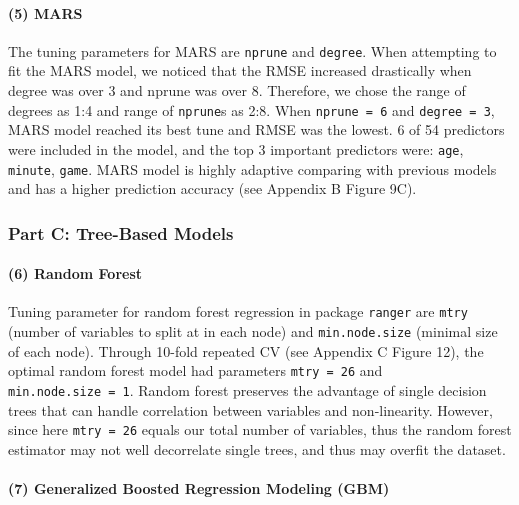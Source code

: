 \documentclass[
]{article}
\begin{document}
\hypertarget{mars}{%
\paragraph{(5) MARS}\label{mars}}

The tuning parameters for MARS are \texttt{nprune} and \texttt{degree}.
When attempting to fit the MARS model, we noticed that the RMSE
increased drastically when degree was over 3 and nprune was over 8.
Therefore, we chose the range of degrees as 1:4 and range of
\texttt{nprune}s as 2:8. When \texttt{nprune\ =\ 6} and
\texttt{degree\ =\ 3}, MARS model reached its best tune and RMSE was the
lowest. 6 of 54 predictors were included in the model, and the top 3
important predictors were: \texttt{age}, \texttt{minute}, \texttt{game}.
MARS model is highly adaptive comparing with previous models and has a
higher prediction accuracy (see Appendix B Figure 9C).

\hypertarget{part-c-tree-based-models}{%
\subsubsection{Part C: Tree-Based
Models}\label{part-c-tree-based-models}}

\hypertarget{random-forest}{%
\paragraph{(6) Random Forest}\label{random-forest}}

Tuning parameter for random forest regression in package \texttt{ranger}
are \texttt{mtry} (number of variables to split at in each node) and
\texttt{min.node.size} (minimal size of each node). Through 10-fold
repeated CV (see Appendix C Figure 12), the optimal random forest model
had parameters \texttt{mtry\ =\ 26} and \texttt{min.node.size\ =\ 1}.
Random forest preserves the advantage of single decision trees that can
handle correlation between variables and non-linearity. However, since
here \texttt{mtry\ =\ 26} equals our total number of variables, thus the
random forest estimator may not well decorrelate single trees, and thus
may overfit the dataset.

\hypertarget{generalized-boosted-regression-modeling-gbm}{%
\paragraph{(7) Generalized Boosted Regression Modeling
(GBM)}\label{generalized-boosted-regression-modeling-gbm}}
\end{document}
